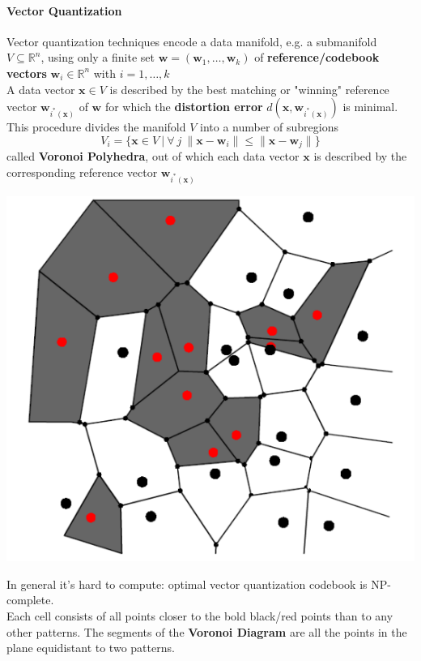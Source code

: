 \documentclass[10pt]{report}
\begin{document}
\paragraph{Vector Quantization} Vector quantization techniques encode a data manifold, e.g. a submanifold $V\subseteq \mathbb{R}^n$, using only a finite set $\mathbf{w}=(\mathbf{w}_1,\ldots,\mathbf{w}_k)$ of \textbf{reference/codebook vectors} $\mathbf{w}_i\in \mathbb{R}^n$ with $i=1,\ldots,k$\\
A data vector $\mathbf{x}\in V$ is described by the best matching or "winning" reference vector $\mathbf{w}_{i^*(\mathbf{x})}$ of $\mathbf{w}$ for which the \textbf{distortion error} $d(\mathbf{x}, \mathbf{w}_{i^*(\mathbf{x})})$ is minimal.\\
This procedure divides the manifold $V$ into a number of subregions $$V_i=\{\mathbf{x}\in V\:|\:\forall\:j\:\|\mathbf{x}-\mathbf{w}_i\|\leq \|\mathbf{x}-\mathbf{w}_j\|\}$$ called \textbf{Voronoi Polyhedra}, out of which each data vector $\mathbf{x}$ is described by the corresponding reference vector $\mathbf{w}_{i^*(\mathbf{x})}$
\begin{center}
	\includegraphics[scale=0.5]{32.png}
\end{center}
In general it's hard to compute: optimal vector quantization codebook is NP-complete.\\
Each cell consists of all points closer to the bold black/red points than to any other patterns. The segments of the \textbf{Voronoi Diagram} are all the points in the plane equidistant to two patterns.\\
\end{document}
